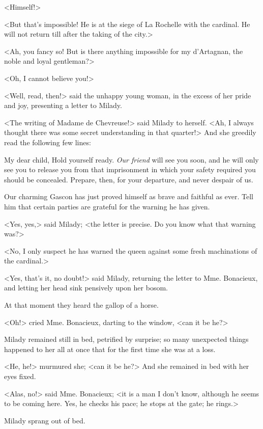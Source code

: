 <Himself!> 

<But that's impossible! He is at the siege of La Rochelle with the cardinal. He will not return till after the taking of the city.> 

<Ah, you fancy so! But is there anything impossible for my d'Artagnan, the noble and loyal gentleman?> 

<Oh, I cannot believe you!> 

<Well, read, then!> said the unhappy young woman, in the excess of her pride and joy, presenting a letter to Milady. 

<The writing of Madame de Chevreuse!> said Milady to herself. <Ah, I always thought there was some secret understanding in that quarter!> And she greedily read the following few lines: 

\begin{mail}{}{My dear child,} 
Hold yourself ready. \textit{Our friend} will see you soon, and he will only see you to release you from that imprisonment in which your safety required you should be concealed. Prepare, then, for your departure, and never despair of us.

Our charming Gascon has just proved himself as brave and faithful as ever. Tell him that certain parties are grateful for the warning he has given. 
\end{mail}

<Yes, yes,> said Milady; <the letter is precise. Do you know what that warning was?> 

<No, I only suspect he has warned the queen against some fresh machinations of the cardinal.> 

<Yes, that's it, no doubt!> said Milady, returning the letter to Mme. Bonacieux, and letting her head sink pensively upon her bosom. 

At that moment they heard the gallop of a horse. 

<Oh!> cried Mme. Bonacieux, darting to the window, <can it be he?> 

Milady remained still in bed, petrified by surprise; so many unexpected things happened to her all at once that for the first time she was at a loss. 

<He, he!> murmured she; <can it be he?> And she remained in bed with her eyes fixed. 

<Alas, no!> said Mme. Bonacieux; <it is a man I don't know, although he seems to be coming here. Yes, he checks his pace; he stops at the gate; he rings.> 

Milady sprang out of bed. 

